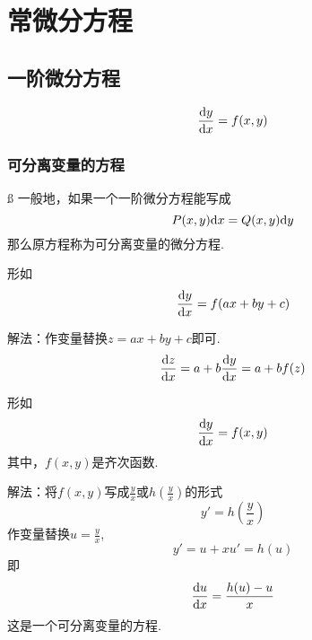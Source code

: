 \chapter{常微分方程}
\section{一阶微分方程}
\vspace*{-1em}
\begin{equation}
	\frac{{\rm{d}} y}{{\rm{d}} x}=f(x,y)
\end{equation} 
\subsection{可分离变量的方程}ß
一般地，如果一个一阶微分方程能写成
\begin{equation}
	P(x,y){\rm{d}} x=Q(x,y) {\rm{d}} y
\end{equation}
那么原方程称为可分离变量的微分方程.

\example[可分离变量的方程1]
形如
\begin{equation}
	\frac{{\rm{d}} y}{{\rm{d}} x}=f(ax+by+c)
\end{equation}
\par 解法：作变量替换$z=ax+by+c$即可.
\begin{equation}
	\frac{{\rm{d}} z}{{\rm{d}} x}=a+b\frac{{\rm{d}} y}{{\rm{d}} x}=a+bf(z)
\end{equation}

\example[可分离变量的方程2]
形如
\begin{equation}
	\frac{{\rm{d}} y}{{\rm{d}} x}=f(x,y)
\end{equation}
其中，$f(x,y)$是齐次函数.
\par 解法：将$f(x,y)$写成$\displaystyle \frac{y}{x}$或$\displaystyle h\left( \frac{y}{x}\right) $的形式
\begin{equation}
	y'=h(\frac{y}{x})
\end{equation}
作变量替换$\displaystyle u=\frac{y}{x}$,
\begin{equation}
	y'=u+xu'=h(u)
\end{equation}
即
\begin{equation}
	\frac{{\rm{d}} u}{{\rm{d}} x}=\frac{h(u)-u}{x}
\end{equation}
这是一个可分离变量的方程.
\newpage 

